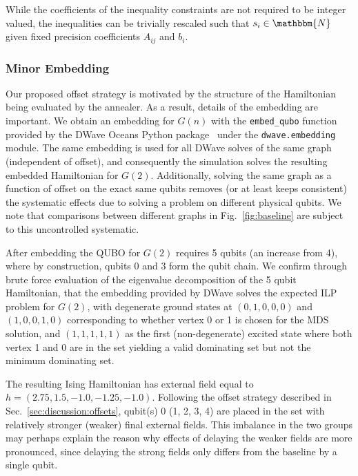 \documentclass[prd,twocolumn,tightenlines,preprintnumbers,showpacs,superscriptaddress,notitlepage,nofootinbib,eqsecnum,floatfix,longbibliography,aps,10pt]{revtex4-2}
\begin{document}
While the coefficients of the inequality constraints are not required to be integer valued, the inequalities can be trivially rescaled such that $s_i \in \mathbbm{N}$ given fixed precision coefficients $A_{ij}$ and $b_i$.

\subsubsection{Minor Embedding}
\label{sec:methods:minor_embedding}
Our proposed offset strategy is motivated by the structure of the Hamiltonian being evaluated by the annealer.
As a result, details of the embedding are important. We obtain an embedding for $G(n)$ with the \texttt{embed\_qubo} function provided by the DWave Oceans Python package~\cite{dwave_oceans} under the \texttt{dwave.embedding} module.
The same embedding is used for all DWave solves of the same graph (independent of offset), and consequently the simulation solves the resulting embedded Hamiltonian for $G(2)$.
Additionally, solving the same graph as a function of offset on the exact same qubits removes (or at least keeps consistent) the systematic effects due to solving a problem on different physical qubits.
We note that comparisons between different graphs in Fig.~\ref{fig:baseline} are subject to this uncontrolled systematic.

After embedding the QUBO for $G(2)$ requires 5 qubits (an increase from 4), where by construction, qubits 0 and 3 form the qubit chain.
We confirm through brute force evaluation of the eigenvalue decomposition of the 5 qubit Hamiltonian, that the embedding provided by DWave solves the expected ILP problem for $G(2)$, with degenerate ground states at $(0, 1, 0, 0, 0)$ and $(1, 0, 0, 1, 0)$ corresponding to whether vertex 0 or 1 is chosen for the MDS solution, and $(1, 1, 1, 1, 1)$ as the first (non-degenerate) excited state where both vertex 1 and 0 are in the set yielding a valid dominating set but not the minimum dominating set.

The resulting Ising Hamiltonian has external field equal to $h = (2.75, 1.5, -1.0, -1.25, -1.0)$.
Following the offset strategy described in Sec.~\ref{sec:discussion:offsets}, qubit(s) 0 (1, 2, 3, 4) are placed in the set with relatively stronger (weaker) final external fields.
This imbalance in the two groups may perhaps explain the reason why effects of delaying the weaker fields are more pronounced, since delaying the strong fields only differs from the baseline by a single qubit.
\end{document}
